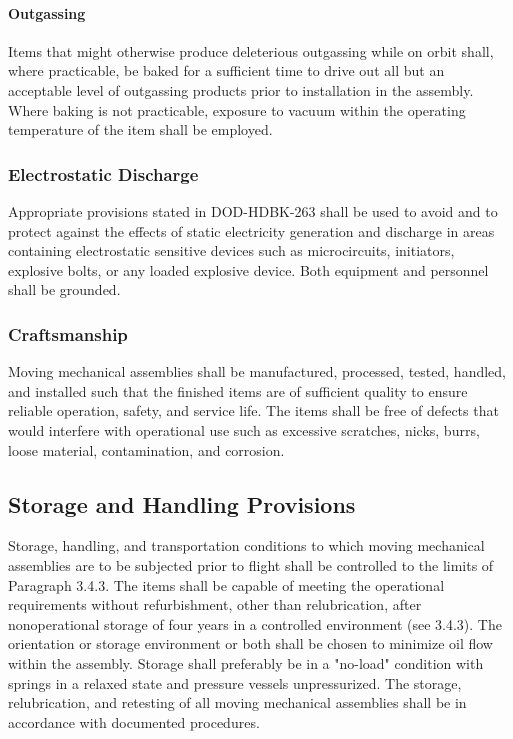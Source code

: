 \documentclass[12pt]{article}
\begin{document}
\paragraph{Outgassing} %
Items that might otherwise produce deleterious outgassing while on orbit shall, where practicable, be baked for a sufficient time to drive out all but an acceptable level of outgassing products prior to installation in the assembly. 
Where baking is not practicable, exposure to vacuum within the operating temperature of the item shall be employed.

\subsubsection{Electrostatic Discharge} %
Appropriate provisions stated in DOD-HDBK-263 shall be used to avoid and to protect against the effects of static electricity generation and discharge in areas containing electrostatic sensitive devices such as microcircuits, initiators, explosive bolts, or any loaded explosive device. 
Both equipment and personnel shall be grounded.

\subsubsection{Craftsmanship} %
Moving mechanical assemblies shall be manufactured, processed, tested, handled, and installed such that the finished items are of sufficient quality to ensure reliable operation, safety, and service life. 
The items shall be free of defects that would interfere with operational use such as excessive scratches, nicks, burrs, loose material, contamination, and corrosion.

\subsection{Storage and Handling Provisions} %
Storage, handling, and transportation conditions to which moving mechanical assemblies are to be subjected prior to flight shall be controlled to the limits of Paragraph 3.4.3. 
The items shall be capable of meeting the operational requirements without refurbishment, other than relubrication, after nonoperational storage of four years in a controlled environment (see 3.4.3).
The orientation or storage environment or both shall be chosen to minimize oil flow within the assembly. 
Storage shall preferably be in a "no-load" condition with springs in a relaxed state and pressure vessels unpressurized. 
The storage, relubrication, and retesting of all moving mechanical assemblies shall be in accordance with documented procedures.
\end{document}
